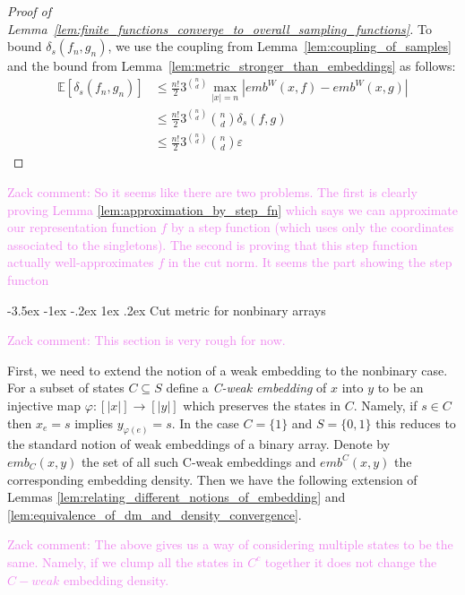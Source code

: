 \documentclass[11pt,oneside,reqno]{article}
\makeatletter
\theoremstyle{plain}
\theoremstyle{definition}
\numberwithin{equation}{section}
\def\subsection#1{\@startsection {subsection}{2}{0pt}%
{-3.5ex \@plus -1ex \@minus -.2ex}%
{1ex \@plus.2ex}%
{\bf\mathversion{bold}}{#1}}
\renewcommand{\leq}{\leqslant}
\renewcommand{\phi}{\varphi}
\newcommand{\E}{\mathbb{E}}
\newcommand{\zack}[1]{\textcolor{Violet}{Zack comment: #1}}
\makeatother
\begin{document}
\begin{proof}[Proof of Lemma~\ref{lem:finite_functions_converge_to_overall_sampling_functions}]
    To bound $\delta_s(f_n,g_n)$, we use the coupling from Lemma~\ref{lem:coupling_of_samples} and the bound from Lemma~\ref{lem:metric_stronger_than_embeddings} as follows:
    \begin{align*}
        \E[\delta_s(f_n,g_n)] &\leq \frac{n!}{2} 3^{\binom{n}{d}} \max_{|x|=n}  |emb^W(x,f) - emb^W(x,g)| \\
        &\leq \frac{n!}{2} 3^{\binom{n}{d}} \binom{n}{d} \delta_s(f,g) \\
        &\leq \frac{n!}{2} 3^{\binom{n}{d}}  \binom{n}{d} \varepsilon
    \end{align*}
    \end{proof}

\zack{So it seems like there are two problems. The first is clearly proving Lemma \ref{lem:approximation_by_step_fn} which says we can approximate our representation function $f$ by a step function (which uses only the coordinates associated to the singletons). The second is proving that this step function actually well-approximates $f$ in the cut norm. It seems the part showing the step functon}




\newpage 
\subsection{Cut metric for nonbinary arrays}

\zack{This section is very rough for now. }

First, we need to extend the notion of a weak embedding to the nonbinary case. For a subset of states $C \subseteq S$ define a \textit{C-weak embedding} of $x$ into $y$ to be an injective map $\phi: [|x|] \to [|y|]$ which preserves the states in $C$. Namely, if $s \in C$ then $x_e = s$ implies $y_{\phi(e)} = s$. In the case $C = \{1\}$ and $S = \{0,1\}$ this reduces to the standard notion of weak embeddings of a binary array. Denote by $emb_C(x,y)$ the set of all such C-weak embeddings and $emb^C(x,y)$ the corresponding embedding density. Then we have the following extension of Lemmas \ref{lem:relating_different_notions_of_embedding} and \ref{lem:equivalence_of_dm_and_density_convergence}. 

\zack{The above gives us a way of considering multiple states to be the same. Namely, if we clump all the states in $C^c$ together it does not change the $C-weak$ embedding density.}
\end{document}
